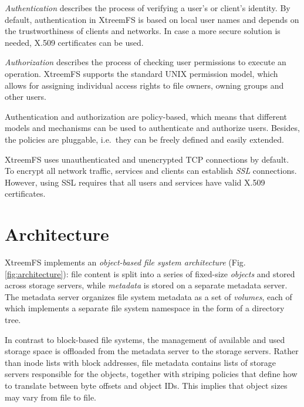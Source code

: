 \documentclass[a4paper,10pt]{book}
\begin{document}
\emph{Authentication}  describes the process of verifying a user's or client's identity. By default, authentication in XtreemFS is based on local user names and depends on the trustworthiness of clients and networks. In case a more secure solution is needed, X.509 certificates can be used.

\emph{Authorization} describes the process of checking user permissions to execute an operation. XtreemFS supports the standard UNIX permission model, which allows for assigning individual access rights to file owners, owning groups and other users.

Authentication and authorization are policy-based, which means that different models and mechanisms can be used to authenticate and authorize users. Besides, the policies are pluggable, i.e.\ they can be freely defined and easily extended.

XtreemFS uses unauthenticated and unencrypted TCP connections by default. To encrypt all network traffic, services and clients can establish \emph{SSL} connections. However, using SSL requires that all users and services have valid X.509 certificates.


\section{Architecture}
XtreemFS implements an \emph{object-based file system architecture} (Fig. \ref{fig:architecture}): file content is split into a series of fixed-size \emph{objects} and stored across storage servers, while \emph{metadata} is stored on a separate metadata server. The metadata server organizes file system metadata as a set of \emph{volumes}, each of which implements a separate file system namespace in the form of a directory tree.

In contrast to block-based file systems, the management of available and used storage space is offloaded from the metadata server to the storage servers. Rather than inode lists with block addresses, file metadata contains lists of storage servers responsible for the objects, together with striping policies that define how to translate between byte offsets and object IDs. This implies that object sizes may vary from file to file.
\end{document}
